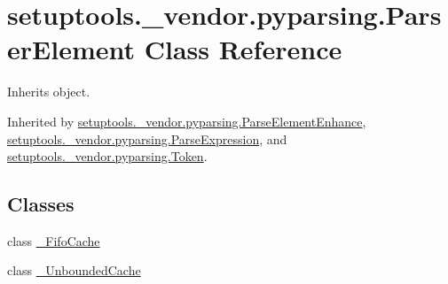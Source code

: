 \hypertarget{classsetuptools_1_1__vendor_1_1pyparsing_1_1_parser_element}{}\section{setuptools.\+\_\+vendor.\+pyparsing.\+Parser\+Element Class Reference}
\label{classsetuptools_1_1__vendor_1_1pyparsing_1_1_parser_element}


Inherits object.



Inherited by \hyperlink{classsetuptools_1_1__vendor_1_1pyparsing_1_1_parse_element_enhance}{setuptools.\+\_\+vendor.\+pyparsing.\+Parse\+Element\+Enhance}, \hyperlink{classsetuptools_1_1__vendor_1_1pyparsing_1_1_parse_expression}{setuptools.\+\_\+vendor.\+pyparsing.\+Parse\+Expression}, and \hyperlink{classsetuptools_1_1__vendor_1_1pyparsing_1_1_token}{setuptools.\+\_\+vendor.\+pyparsing.\+Token}.

\subsection*{Classes}
\begin{DoxyCompactItemize}
\item 
class \hyperlink{classsetuptools_1_1__vendor_1_1pyparsing_1_1_parser_element_1_1___fifo_cache}{\+\_\+\+Fifo\+Cache}
\item 
class \hyperlink{classsetuptools_1_1__vendor_1_1pyparsing_1_1_parser_element_1_1___unbounded_cache}{\+\_\+\+Unbounded\+Cache}
\end{DoxyCompactItemize}

